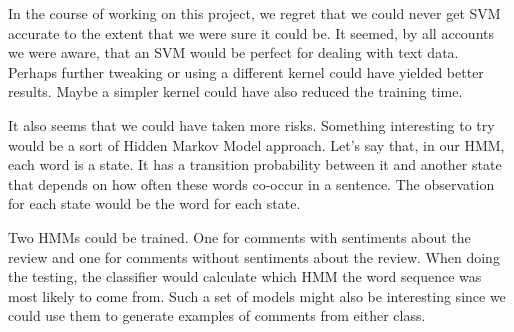 \documentclass[]{report}
\begin{document}
In the course of working on this project, we regret that we could never get SVM accurate to the extent that we were sure it could be.  It seemed, by all accounts we were aware, that an SVM would be perfect for dealing with text data.  Perhaps further tweaking or using a different kernel could have yielded better results.  Maybe a simpler kernel could have also reduced the training time.

It also seems that we could have taken more risks.  Something interesting to try would be a sort of Hidden Markov Model approach.  Let's say that, in our HMM, each word is a state.  It has a transition probability between it and another state that depends on how often these words co-occur in a sentence.  The observation for each state would be the word for each state.

Two HMMs could be trained.  One for comments with sentiments about the review and one for comments without sentiments about the review.  When doing the testing, the classifier would calculate which HMM the word sequence was most likely to come from.  Such a set of models might also be interesting since we could use them to generate examples of comments from either class.
\end{document}
